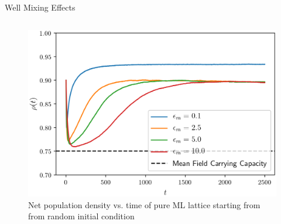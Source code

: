 \documentclass[aspectratio=169]{beamer}
\begin{document}
\begin{frame}[t]{Well Mixing Effects}
\begin{columns}
\begin{column}{0.5\textwidth}
                \vspace{-10pt}

                \begin{figure}[h]
                    \centering
                    \hspace{-17.8pt}
                    \includegraphics[width=1.0\linewidth]{images/net_densities.png}

                    \vspace{0pt}

                    \caption{Net population density vs. time of pure ML lattice starting from from random initial
                    condition}
                \end{figure}
            \end{column}
        \end{columns}
        
    \end{frame}




\end{document}

